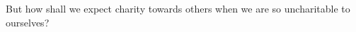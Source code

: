 \documentclass[MAIN]{subfiles}
\begin{document}
But how shall we expect charity towards others when we are so uncharitable to ourselves?
\end{document}
